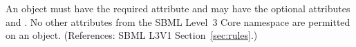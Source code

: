 An \AssignmentRule object must have the required attribute 
and may have the optional attributes  and .
No other attributes from the SBML Level~3 Core namespace are permitted on
an \AssignmentRule object.  (References: SBML L3V1
Section~\ref{sec:rules}.)
